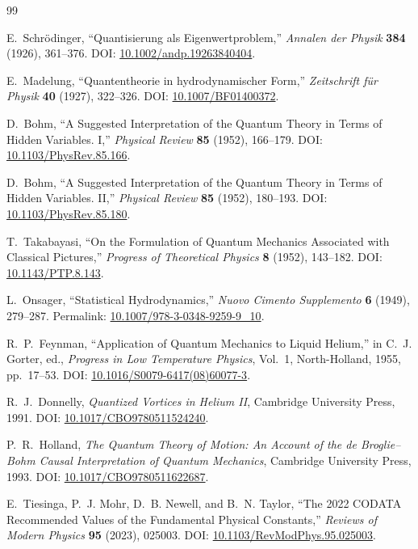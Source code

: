 \documentclass[11pt,a4paper]{article}
\begin{document}
\begin{thebibliography}{99}

E.~Schr\"odinger,
``Quantisierung als Eigenwertproblem,''
\emph{Annalen der Physik} \textbf{384} (1926), 361--376.
DOI: \href{https://doi.org/10.1002/andp.19263840404}{10.1002/andp.19263840404}.

E.~Madelung,
``Quantentheorie in hydrodynamischer Form,''
\emph{Zeitschrift f\"ur Physik} \textbf{40} (1927), 322--326.
DOI: \href{https://doi.org/10.1007/BF01400372}{10.1007/BF01400372}.

D.~Bohm,
``A Suggested Interpretation of the Quantum Theory in Terms of Hidden Variables. I,''
\emph{Physical Review} \textbf{85} (1952), 166--179.
DOI: \href{https://doi.org/10.1103/PhysRev.85.166}{10.1103/PhysRev.85.166}.

D.~Bohm,
``A Suggested Interpretation of the Quantum Theory in Terms of Hidden Variables. II,''
\emph{Physical Review} \textbf{85} (1952), 180--193.
DOI: \href{https://doi.org/10.1103/PhysRev.85.180}{10.1103/PhysRev.85.180}.

T.~Takabayasi,
``On the Formulation of Quantum Mechanics Associated with Classical Pictures,''
\emph{Progress of Theoretical Physics} \textbf{8} (1952), 143--182.
DOI: \href{https://doi.org/10.1143/PTP.8.143}{10.1143/PTP.8.143}.

L.~Onsager,
``Statistical Hydrodynamics,''
\emph{Nuovo Cimento Supplemento} \textbf{6} (1949), 279--287.
Permalink: \href{https://doi.org/10.1007/978-3-0348-9259-9_10}{10.1007/978-3-0348-9259-9\_10}.

R.~P.~Feynman,
``Application of Quantum Mechanics to Liquid Helium,''
in C.~J. Gorter, ed., \emph{Progress in Low Temperature Physics}, Vol.~1,
North-Holland, 1955, pp.~17--53.
DOI: \href{https://doi.org/10.1016/S0079-6417(08)60077-3}{10.1016/S0079-6417(08)60077-3}.

R.~J.~Donnelly,
\emph{Quantized Vortices in Helium II},
Cambridge University Press, 1991.
DOI: \href{https://doi.org/10.1017/CBO9780511524240}{10.1017/CBO9780511524240}.

P.~R.~Holland,
\emph{The Quantum Theory of Motion: An Account of the de Broglie--Bohm Causal Interpretation of Quantum Mechanics},
Cambridge University Press, 1993.
DOI: \href{https://doi.org/10.1017/CBO9780511622687}{10.1017/CBO9780511622687}.

E.~Tiesinga, P.~J. Mohr, D.~B. Newell, and B.~N. Taylor,
``The 2022 CODATA Recommended Values of the Fundamental Physical Constants,''
\emph{Reviews of Modern Physics} \textbf{95} (2023), 025003.
DOI: \href{https://doi.org/10.1103/RevModPhys.95.025003}{10.1103/RevModPhys.95.025003}.

\end{thebibliography}
\end{document}
